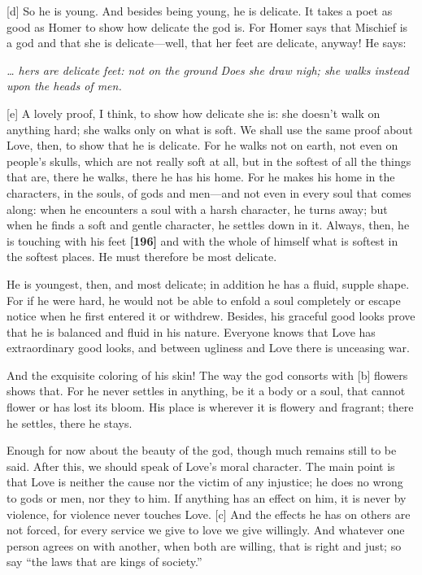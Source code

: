 {[}d{]} So he is young. And besides being young, he is delicate. It
takes a poet as good as Homer to show how delicate the god is. For Homer
says that Mischief is a god and that she is delicate---well, that her
feet are delicate, anyway! He says:\crlf
\crlf

{\em \ldots{} hers are delicate feet: not on the ground}\crlf
{\em Does she draw nigh; she walks instead upon the heads of
men.}\crlf
\crlf

{[}e{]} A lovely proof, I think, to show how delicate she is: she
doesn't walk on anything hard; she walks only on what is soft. We shall
use the same proof about Love, then, to show that he is delicate. For he
walks not on earth, not even on people's skulls, which are not really
soft at all, but in the softest of all the things that are, there he
walks, there he has his home. For he makes his home in the characters,
in the souls, of gods and men---and not even in every soul that comes
along: when he encounters a soul with a harsh character, he turns away;
but when he finds a soft and gentle character, he settles down in it.
Always, then, he is touching with his feet {\bf {[}196{]}} and with the
whole of himself what is softest in the softest places. He must
therefore be most delicate.

He is youngest, then, and most delicate; in addition he has a fluid,
supple shape. For if he were hard, he would not be able to enfold a soul
completely or escape notice when he first entered it or withdrew.
Besides, his graceful good looks prove that he is balanced and fluid in
his nature. Everyone knows that Love has extraordinary good looks, and
between ugliness and Love there is unceasing war.

And the exquisite coloring of his skin! The way the god consorts with
{[}b{]} flowers shows that. For he never settles in anything, be it a
body or a soul, that cannot flower or has lost its bloom. His place is
wherever it is flowery and fragrant; there he settles, there he stays.

Enough for now about the beauty of the god, though much remains still to
be said. After this, we should speak of Love's moral
character. The main
point is that Love is neither the cause nor the victim of any injustice;
he does no wrong to gods or men, nor they to him. If anything has an
effect on him, it is never by violence, for violence never touches Love.
{[}c{]} And the effects he has on others are not forced, for every
service we give to love we give willingly. And whatever one person
agrees on with another, when both are willing, that is right and just;
so say “the laws that are kings of
society.”

